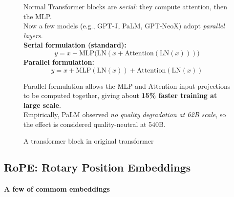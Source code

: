 \begin{figure}[htbp]
\begin{minipage}{0.45\linewidth}
    \caption{A transformer block in original transformer}
  \end{minipage}
  \hfill
  \begin{minipage}{0.5\linewidth}
    \small
      Normal Transformer blocks are \textit{serial}: they compute attention, then the MLP. \\
      Now a few models (e.g., GPT-J, PaLM, GPT-NeoX) adopt \textit{parallel layers}. \\
      \textbf{Serial formulation (standard):}  \\
      \[
        y = x + \mathrm{MLP}\bigl(\mathrm{LN}(x + \mathrm{Attention}(\mathrm{LN}(x)))\bigr)
      \]
      \textbf{Parallel formulation:}
      \[
        y = x + \mathrm{MLP}(\mathrm{LN}(x)) + \mathrm{Attention}(\mathrm{LN}(x))
      \]

      Parallel formulation allows the MLP and Attention input projections to be computed together, giving about 
      \textbf{15\% faster training at large scale}. \\ 
      Empirically, PaLM observed \textit{no quality degradation at 62B scale}, so the effect is considered quality-neutral at 540B.
  \end{minipage}
\end{figure}


\clearpage
\subsection{RoPE: Rotary Position Embeddings}

\paragraph{A few of commom embeddings}~{}
\\

